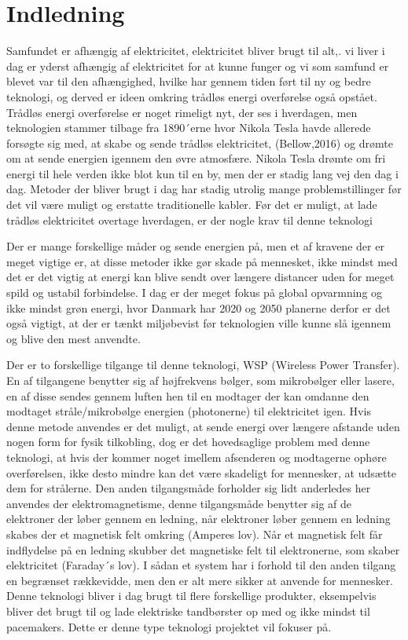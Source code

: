 \chapter{Indledning}
Samfundet er afhængig af elektricitet, elektricitet bliver brugt til alt,. vi liver i dag er yderst afhængig af elektricitet for at kunne funger og vi som samfund er blevet var til den afhængighed, hvilke har gennem tiden ført til ny og bedre teknologi, og derved er ideen omkring trådløs energi overførelse også opstået. Trådløs energi overførelse er noget rimeligt nyt, der ses i hverdagen, men teknologien stammer tilbage fra 1890´erne hvor Nikola Tesla havde allerede forsøgte sig med, at skabe og sende trådløs elektricitet, (Bellow,2016) og drømte om at sende energien igennem den øvre atmosfære. Nikola Tesla drømte om fri energi til hele verden ikke blot kun til en by, men der er stadig lang vej den dag i dag. Metoder der bliver brugt i dag har stadig utrolig mange problemstillinger før det vil være muligt og erstatte traditionelle kabler. Før det er muligt, at lade trådløs elektricitet overtage hverdagen, er der nogle krav til denne teknologi 

Der er mange forskellige måder og sende energien på, men et af kravene der er meget vigtige er, at disse metoder ikke gør skade på mennesket, ikke mindst med det er det vigtig at energi kan blive sendt over længere distancer uden for meget spild og ustabil forbindelse. I dag er der meget fokus på global opvarmning og ikke mindst grøn energi, hvor Danmark har 2020 og 2050 planerne derfor er det også vigtigt, at der er tænkt miljøbevist før teknologien ville kunne slå igennem og blive den mest anvendte.

Der er to forskellige tilgange til denne teknologi, WSP (Wireless Power Transfer). En af tilgangene benytter sig af højfrekvens bølger, som mikrobølger eller lasere, en af disse sendes gennem luften hen til en modtager der kan omdanne den modtaget stråle/mikrobølge energien (photonerne) til elektricitet igen. Hvis denne metode anvendes er det muligt, at sende energi over længere afstande uden nogen form for fysik tilkobling, dog er det hovedsaglige problem med denne teknologi, at hvis der kommer noget imellem afsenderen og modtagerne ophøre overførelsen, ikke desto mindre kan det være skadeligt for mennesker, at udsætte dem for strålerne. Den anden tilgangsmåde forholder sig lidt anderledes her anvendes der elektromagnetisme, denne tilgangsmåde benytter sig af de elektroner der løber gennem en ledning, når elektroner løber gennem en ledning skabes der et magnetisk felt omkring (Amperes lov).  Når et magnetisk felt får indflydelse på en ledning skubber det magnetiske felt  til elektronerne, som skaber elektricitet (Faraday´s lov). I sådan et system har i forhold til den anden tilgang en begrænset rækkevidde, men den er alt mere sikker at anvende for mennesker. Denne teknologi bliver i dag brugt til flere forskellige produkter, eksempelvis bliver det brugt til og lade elektriske tandbørster op med og ikke mindst til pacemakers. Dette er denne type teknologi projektet vil fokuser på. 
